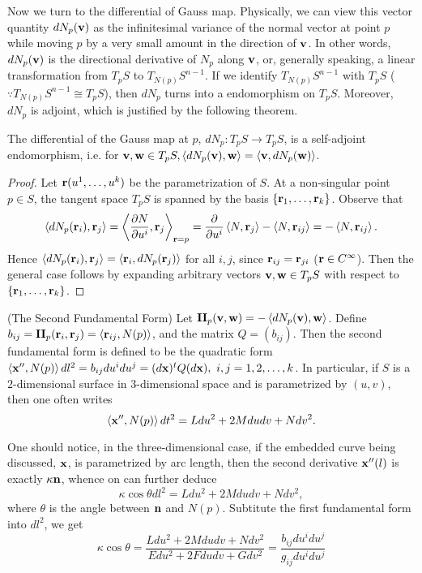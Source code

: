Now we turn to the differential of Gauss map. Physically, we can view this vector quantity $dN_p(\mathbf{v})$ as the infinitesimal variance of the normal vector at point $p$ while moving $p$ by a very small amount in the direction of $\mathbf{v}$. In other words, $dN_p(\mathbf{v})$ is the directional derivative of $N_p$ along $\mathbf{v}$, or, generally speaking, a linear transformation from $T_pS$ to $T_{N(p)}S^{n-1}$. If we identify $T_{N(p)}S^{n-1}$ with $T_{p}S$ ($\because T_{N(p)}S^{n-1} \cong T_{p}S$), then $dN_p$ turns into a endomorphism on $T_{p}S$. Moreover, $dN_p$ is adjoint, which is justified by the following theorem.

\begin{theorem}
	The differential of the Gauss map at $p$, $dN_p: T_pS \rightarrow T_pS$, is a self-adjoint endomorphism, i.e. for $\mathbf{v}, \mathbf{w} \in T_pS, \left< dN_p(\mathbf{v}), \mathbf{w} \right> = \left< \mathbf{v}, dN_p(\mathbf{w}) \right>$.
	\label{thm:gauss_adjoint}
\end{theorem} 

\begin{proof}
	Let $\mathbf{r}(u^1, \dots, u^k)$ be the parametrization of $S$. At a non-singular point $p \in S$, the tangent space $T_pS$ is spanned by the basis $\{\mathbf{r}_1, \dots, \mathbf{r}_k\}$. Observe that
	\[ \left< dN_p(\mathbf{r}_i), \mathbf{r}_j \right> = \left< \frac{ \partial N}{ \partial u^i }, \mathbf{r}_j \right>_{\mathbf{r} = p} = \frac{ \partial  }{ \partial u^i }\left< N, \mathbf{r}_j \right> - \left< N, \mathbf{r}_{ij} \right> = - \left< N, \mathbf{r}_{ij} \right>. \]
	Hence $\left< dN_p(\mathbf{r}_i), \mathbf{r}_j \right> = \left< \mathbf{r}_i, dN_p(\mathbf{r}_j) \right>$ for all $i, j$, since $\mathbf{r}_{ij} = \mathbf{r}_{ji}$ ($\mathbf{r} \in C^{\infty}$). Then the general case follows by expanding arbitrary vectors $\mathbf{v}, \mathbf{w} \in T_pS$ with respect to $\{\mathbf{r}_1, \dots, \mathbf{r}_k\}$.
\end{proof}


\begin{definition}
	(The Second Fundamental Form) Let $\mathbf{II}_{p}(\mathbf{v}, \mathbf{w}) = -\left< dN_p(\mathbf{v}), \mathbf{w} \right>$. Define $b_{ij} = \mathbf{II}_p(\mathbf{r}_i, \mathbf{r}_j) = \left< \mathbf{r}_{ij}, N(p) \right>$, and the matrix $Q = (b_{ij})$. Then the second fundamental form is defined to be the quadratic form $\left< \mathbf{x}'', N(p) \right>dl^2 = b_{ij}du^i du^j = (d\mathbf{x})^tQ(d\mathbf{x}),~ i,j = 1, 2, \dots, k $. In particular, if $S$ is a $2$-dimensional surface in $3$-dimensional space and is parametrized by $(u, v)$, then one often writes \[\left< \mathbf{x}'', N(p) \right> dt^2 = Ldu^2+ 2Mdudv + Ndv^2.\]
\end{definition}

One should notice, in the three-dimensional case, if the embedded curve being discussed, $\mathbf{x}$, is parametrized by arc length, then the second derivative $\mathbf{x}''(l)$ is exactly $\kappa\mathbf{n}$, whence on can further deduce \[\kappa \cos\theta dl^2 = Ldu^2+ 2Mdudv + Ndv^2,\] where $\theta$ is the angle between $\mathbf{n}$ and $N(p)$. Subtitute the first fundamental form into $dl^2$, we get
\[\kappa \cos\theta = \frac{Ldu^2+ 2Mdudv + Ndv^2}{Edu^2 + 2Fdudv + Gdv^2} = \frac{b_{ij} du^idu^j}{g_{ij} du^idu^j}\]

